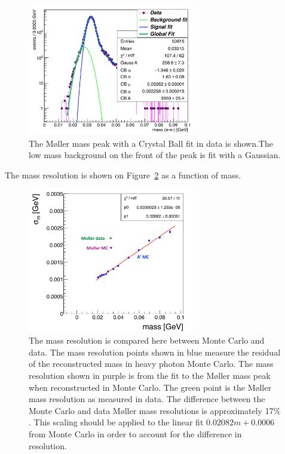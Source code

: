 \begin{figure}[htb]
  \centering
      \includegraphics[width=0.65\textwidth]{pics/searching/mollerMass.png}
  \caption[Fit to the M\o ller mass peak in data]{The M\o ller mass peak with a Crystal Ball fit in data is shown.The low mass background on the front of the peak is fit with a Gaussian.}
  \label{fig:mollerMass}
\end{figure} 

The mass resolution is shown on Figure~\ref{fig:massRes} as a function of mass.

\begin{figure}[htb]
  \centering
      \includegraphics[width=0.65\textwidth]{pics/searching/massResolution.png}
  \caption[Mass resolution compared between Monte Carlo and data]{The mass resolution is compared here between Monte Carlo and data. The mass resolution points shown in blue measure the residual of the reconstructed mass in heavy photon Monte Carlo. The mass resolution shown in purple is from the fit to the M\o ller mass peak when reconstructed in Monte Carlo. The green point is the M\o ller mass resolution as measured in data. The difference between the Monte Carlo and data M\o ller mass resolutions is approximately 17$\%$. This scaling should be applied to the linear fit $0.02082m+0.0006$ from Monte Carlo in order to account for the difference in resolution.}
  \label{fig:massRes}
\end{figure} 

